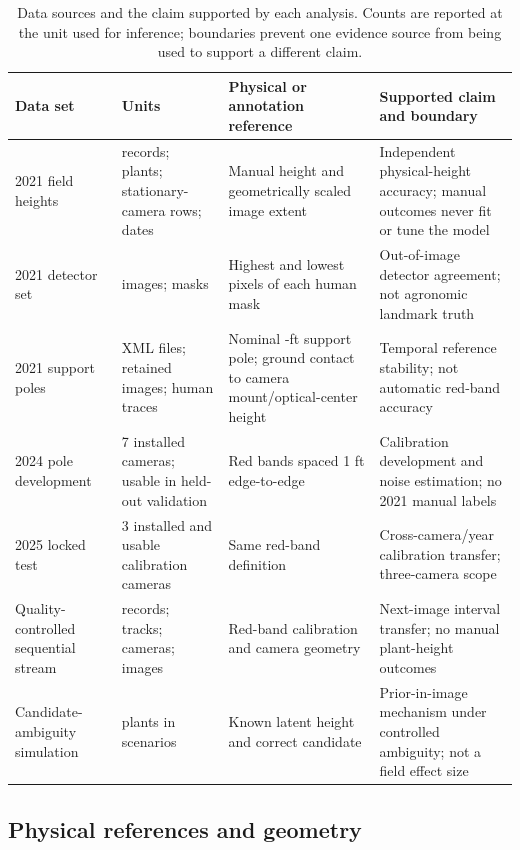 \documentclass[12pt,letterpaper]{article}
\begin{document}
\begin{table}[htbp]
\caption{Data sources and the claim supported by each analysis. Counts are reported at the unit used for inference; boundaries prevent one evidence source from being used to support a different claim.}
\label{tab:design}
\centering
\small
\begin{tabular}{p{2.1cm}p{3.0cm}p{4.2cm}p{4.1cm}}
\toprule
Data set & Units & Physical or annotation reference & Supported claim and boundary \\
\midrule
2021 field heights & \FieldN{} records; \FieldPlants{} plants; \FieldRows{} stationary-camera rows; \FieldDates{} dates & Manual height and geometrically scaled image extent & Independent physical-height accuracy; manual outcomes never fit or tune the model \\
2021 detector set & \PixelImages{} images; \PixelInstances{} masks & Highest and lowest pixels of each human mask & Out-of-image detector agreement; not agronomic landmark truth \\
2021 support poles & \ManualPoleXMLFiles{} XML files; \ManualPoleImages{} retained images; \ManualPoleAnnotations{} human traces & Nominal \SupportPoleLengthFt{}-ft support pole; ground contact to camera mount/optical-center height & Temporal reference stability; not automatic red-band accuracy \\
2024 pole development & 7 installed cameras; \PoleDevCameras{} usable in held-out validation & Red bands spaced 1 ft edge-to-edge & Calibration development and noise estimation; no 2021 manual labels \\
2025 locked test & 3 installed and usable calibration cameras & Same red-band definition & Cross-camera/year calibration transfer; three-camera scope \\
Quality-controlled sequential stream & \PoleStreamRows{} records; \PoleStreamPlants{} tracks; \PoleStreamCameras{} cameras; \PoleStreamImages{} images & Red-band calibration and camera geometry & Next-image interval transfer; no manual plant-height outcomes \\
Candidate-ambiguity simulation & \PriorSimulationPlants{} plants in \PriorSimulationScenarios{} scenarios & Known latent height and correct candidate & Prior-in-image mechanism under controlled ambiguity; not a field effect size \\
\bottomrule
\end{tabular}
\end{table}

\subsection{Physical references and geometry}
\end{document}
